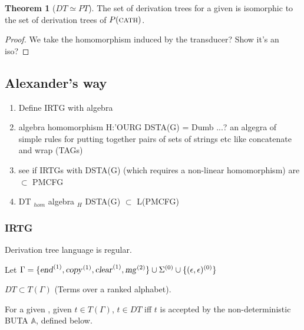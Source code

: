 \documentclass[12pt]{article}
\theoremstyle{definition}
\newtheorem{thm}{Theorem}[section]
\begin{document}
\begin{thm}[$DT \simeq PT$]
  The set of derivation trees for a given \OURG is isomorphic to the set of derivation trees of $P(\text{\textsc{cath}})$.
\end{thm}

\begin{proof}
  We take the homomorphism induced by the transducer? Show it's an iso?
  
\end{proof}


\subsection{Alexander's way}
\label{sec:alexanders-way}

\begin{enumerate}
\item Define IRTG with \OURG algebra
\item algebra homomorphism H:'OURG \arr DSTA(G) = Dumb ...? an algegra of simple rules for putting together pairs of sets of strings etc like concatenate and wrap (TAGs)
\item see if IRTGs with DSTA(G) (which requires a non-linear homomorphism) are $\subset$ PMCFG
\item \OURG \arr DT \arr$_{hom}$ \OURG algebra \arr$_{H}$ DSTA(G) $\subset$ L(PMCFG) 
\end{enumerate}

\subsubsection{IRTG}
\label{sec:irtg}

Derivation tree language is regular.

Let  $\Gamma = \{\text{\textsl{end}}^{(1)},\text{\textsl{copy}}^{(1)},\text{\textsl{clear}}^{(1)},\text{\textsl{mg}}^{(2)}\}\cup\Sigma^{(0)}\cup\{(\epsilon,\epsilon)^{(0)}\}$

$DT \subset T(\Gamma)$ (Terms over a ranked alphabet).

For a given \BIGR, given $t\in T(\Gamma)$, $t\in DT$ iff $t$ is accepted by the non-deterministic BUTA $\mathbb{A}$, defined below.
\end{document}
